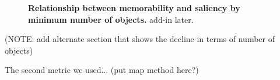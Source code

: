 \begin{figure}[t]
\centering
{}
\vspace{-5mm}\caption{\footnotesize\textbf{Relationship between memorability and saliency by minimum number of objects.} add-in later. }\label{fig:exampleStimuli}
\end{figure} 

(NOTE: add alternate section that shows the decline in terms of number of objects)

The second metric we used... (put map method here?)

